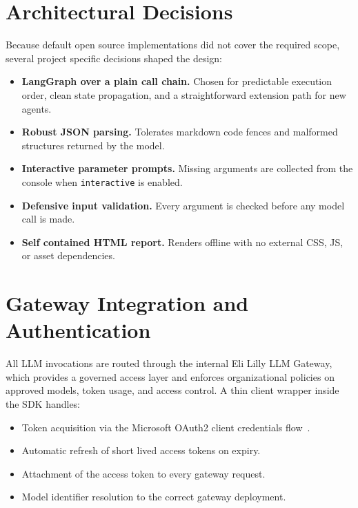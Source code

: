 \documentclass[12pt, a4paper, oneside]{report}
\begin{document}
\newpage

\section{Architectural Decisions}

Because default open source implementations did not cover the required scope, several project specific decisions shaped the design:

\begin{itemize}
    \item \textbf{LangGraph over a plain call chain.} Chosen for predictable execution order, clean state propagation, and a straightforward extension path for new agents.
    \item \textbf{Robust JSON parsing.} Tolerates markdown code fences and malformed structures returned by the model.
    \item \textbf{Interactive parameter prompts.} Missing arguments are collected from the console when \texttt{interactive} is enabled.
    \item \textbf{Defensive input validation.} Every argument is checked before any model call is made.
    \item \textbf{Self contained HTML report.} Renders offline with no external CSS, JS, or asset dependencies.
\end{itemize}

\section{Gateway Integration and Authentication}

All LLM invocations are routed through the internal Eli Lilly LLM Gateway, which provides a governed access layer and enforces organizational policies on approved models, token usage, and access control. A thin client wrapper inside the SDK handles:

\begin{itemize}
    \item Token acquisition via the Microsoft OAuth2 client credentials flow~\cite{msoauth2}.
    \item Automatic refresh of short lived access tokens on expiry.
    \item Attachment of the access token to every gateway request.
    \item Model identifier resolution to the correct gateway deployment.
\end{itemize}
\end{document}
